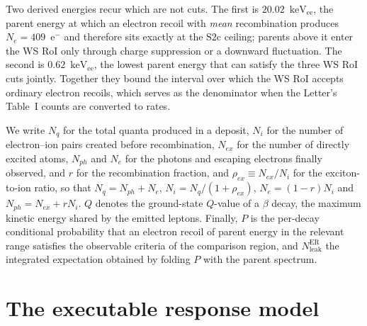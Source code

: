 \documentclass[11pt,a4paper]{article}
\newcommand{\keVee}{\ensuremath{\mathrm{keV_{ee}}}}
\begin{document}
Two derived energies recur which are not cuts. The first is
\(20.02\)~\keVee, the parent energy at which an electron recoil with
\emph{mean} recombination produces \(N_e=409\)~e\(^-\) and therefore
sits exactly at the \(\mathrm{S2c}\) ceiling; parents above it enter the
WS RoI only through charge suppression or a downward fluctuation. The
second is \(0.62\)~\keVee, the lowest parent energy that can satisfy
the three WS RoI cuts jointly. Together they bound the interval over
which the WS RoI accepts ordinary electron recoils, which serves as the
denominator when the Letter's Table~I counts are converted to rates.

We write \(N_q\) for the total quanta produced in a deposit, \(N_i\) for
the number of electron--ion pairs created before recombination,
\(N_{ex}\) for the number of directly excited atoms, \(N_{ph}\) and
\(N_e\) for the photons and escaping electrons finally observed, and
\(r\) for the recombination fraction, and \(\rho_{ex}\equiv N_{ex}/N_i\)
for the exciton-to-ion ratio, so that \(N_q=N_{ph}+N_e\),
\(N_i=N_q/(1+\rho_{ex})\), \(N_e=(1-r)N_i\) and \(N_{ph}=N_{ex}+rN_i\).
\(Q\) denotes the ground-state \(Q\)-value of a \(\beta\) decay, the
maximum kinetic energy shared by the emitted leptons. Finally, \(P\) is
the {per-decay conditional probability} that an electron recoil
of parent energy in the relevant range satisfies the observable criteria
of the comparison region, and \(N^{\mathrm{ER}}_{\mathrm{leak}}\) the
{integrated expectation} obtained by folding \(P\) with the
parent spectrum.


\section{The executable response model}%
\label{sec:recon}
\end{document}
